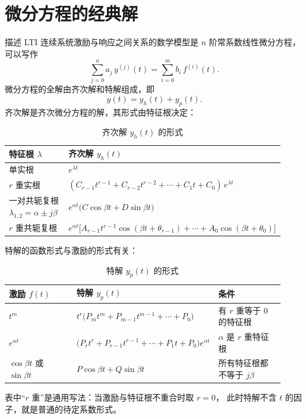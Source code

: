 \section{微分方程的经典解}

描述 LTI 连续系统激励与响应之间关系的数学模型是 $n$ 阶常系数线性微分方程，
可以写作
\[
    \sum_{j=0}^{n}a_j\,y^{(j)}(t)=\sum_{i=0}^{m}b_i\,f^{(i)}(t).
\]
微分方程的全解由齐次解和特解组成，即
\[
    y(t)=y_h(t)+y_p(t).
\]
齐次解是齐次微分方程的解，其形式由特征根决定：

\begin{table}[htbp]
\centering
\caption{齐次解 $y_h(t)$ 的形式}
\small
\begin{tabular}{@{}p{0.31\linewidth}p{0.61\linewidth}@{}}
\toprule
特征根 $\lambda$ & 齐次解 $y_h(t)$ \\
\midrule
单实根 & $e^{\lambda t}$ \\
$r$ 重实根 & $(C_{r-1}t^{r-1}+C_{r-2}t^{r-2}+\cdots+C_1t+C_0)\,e^{\lambda t}$ \\
一对共轭复根 $\lambda_{1,2}=\alpha\pm j\beta$ &
$e^{\alpha t}\bigl(C\cos\beta t+D\sin\beta t\bigr)$ \\
$r$ 重共轭复根 &
$e^{\alpha t}\bigl[A_{r-1}t^{r-1}\cos(\beta t+\theta_{r-1})+\cdots+A_0\cos(\beta t+\theta_0)\bigr]$ \\
\bottomrule
\end{tabular}
\end{table}

特解的函数形式与激励的形式有关：

\begin{table}[htbp]
\centering
\caption{特解 $y_p(t)$ 的形式}
\small
\begin{tabular}{@{}p{0.26\linewidth}p{0.40\linewidth}p{0.26\linewidth}@{}}
\toprule
激励 $f(t)$ & 特解 $y_p(t)$ & 条件 \\
\midrule
$t^{m}$ & $t^{r}\bigl(P_mt^{m}+P_{m-1}t^{m-1}+\cdots+P_0\bigr)$ &
有 $r$ 重等于 $0$ 的特征根 \\
$e^{\alpha t}$ & $\bigl(P_rt^{r}+P_{r-1}t^{r-1}+\cdots+P_1t+P_0\bigr)e^{\alpha t}$ &
$\alpha$ 是 $r$ 重特征根 \\
$\cos\beta t$ 或 $\sin\beta t$ & $P\cos\beta t+Q\sin\beta t$ &
所有特征根都不等于 $j\beta$ \\
\bottomrule
\end{tabular}
\end{table}

\begin{note}
表中“$r$ 重”是通用写法：当激励与特征根不重合时取 $r=0$，
此时特解不含 $t$ 的因子，就是普通的待定系数形式。
\end{note}

